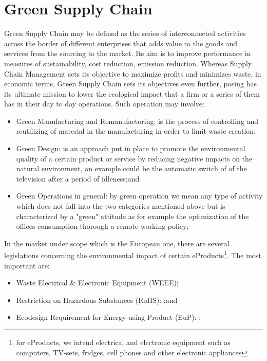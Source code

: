 \documentclass{article}
\begin{document}
\section{Green Supply Chain}
  Green Supply Chain may be defined as the series of interconnected activities across the border of different enterprises that adds value to the goods and services from the sourcing to the market. Its aim is to improve performance in measures of sustainability, cost reduction, emission reduction. Whereas Supply Chain Management sets its objective to maximize profits and minimizes waste, in economic terms, Green Supply Chain sets its objectives even further, posing has its ultimate mission to lower the ecological impact that a firm or a series of them has in their day to day operations. Such operation may involve:
  \begin{itemize}
    \item Green Manufacturing and Remanufactoring: is the process of controlling and reutilizing of material in the manufacturing in order to limit waste creation\cite{urvashi_green_2013};
    \item Green Design: is an approach put in place to promote the environmental quality of a certain product or service  by reducing negative impacts on the natural environment, an example could be the automatic switch of of the television after a period of idleness\cite{ceschin_evolution_2016};and
    \item Green Operations in general: by green operation we mean any type of activity which does not fall into the two categories mentioned above but is characterized by a "green" attitude as for example the optimization of the offices consumption thorough a remote-working policy;
  \end{itemize}

  In the market under scope which is the European one, there are several legislations concerning the environmental impact of certain eProducts\footnote{for eProducts, we intend electrical and electronic equipment such as computers, TV-sets, fridges, cell phones and other electronic appliances}. The most important are:
  \begin{itemize}
    \item Waste Electrical \& Electronic Equipment (WEEE);
    \item Restriction on Hazardous Substances (RoHS): ;and
    \item Ecodesign Requirement for Energy-using Product (EuP): :
  \end{itemize}
\end{document}
